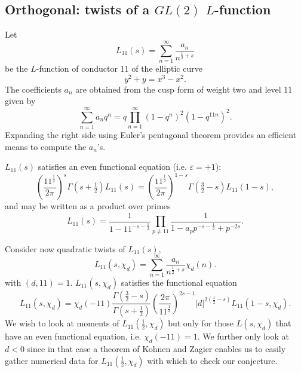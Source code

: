 \documentclass[12pt,letterpaper]{amsart}
\theoremstyle{plain}
\theoremstyle{definition}
\theoremstyle{remark}
\numberwithin{equation}{subsection}
\numberwithin{theorem}{subsection}
\numberwithin{table}{subsection}
\begin{document}

\subsection{  Orthogonal: twists of a $GL(2)$ $L$-function
}\label{sec:orthogonalnumerics}



Let
\begin{equation}
    L_{11}(s)=\sum_{n=1}^\infty \frac{a_n}{n^{\frac12 +s}}
\end{equation}
be the $L$-function of conductor 11 of the elliptic curve
\begin{equation}
    y^2+y=x^3-x^2.
\end{equation}
The coefficients $a_n$ are obtained from the cusp form of weight
two and level 11 given by
\begin{equation}
    \sum_{n=1}^\infty a_n q^n = q \prod_{n=1}^\infty (1-q^n)^2
(1-q^{11n})^2.
\end{equation}
Expanding the right side using Euler's pentagonal theorem provides
an efficient means to compute the $a_n$'s.

$L_{11}(s)$ satisfies an even functional equation (i.e.
$\varepsilon=+1$):
\begin{equation}
   \left(\frac{11^{\frac12 }}{2\pi}\right)^s\Gamma(s+\tfrac12 )L_{11}(s) =
   \left(\frac{11^{\frac12 }}{2\pi}\right)^{1-s}\Gamma(\tfrac32-s)L_{11}(1-s),
\end{equation}
and may be written as a product over primes
\begin{equation}
    L_{11}(s)=
    \frac{1}{1-11^{-s-\frac12 }}
    \prod_{p \neq 11}
    \frac{1}{1-a_pp^{-s-\frac12 }+p^{-2s}}.
\end{equation}

Consider now quadratic twists of $L_{11}(s)$,
\begin{equation}
    L_{11}(s,\chi_d)=\sum_{n=1}^\infty \frac{a_n}{n^{\frac12 +s}}
\chi_d(n).
\end{equation}
with $(d,11)=1$.
$L_{11}(s,\chi_d)$ satisfies the functional equation
\begin{equation}
    L_{11}(s,\chi_d) = \chi_d(-11)
                       \frac{\Gamma(\frac32-s)}{\Gamma(s+\frac12 )}
                       \left(\frac{2\pi}{11^{\frac12 }}\right)^{2s-1}
                       |d|^{2(\frac12 -s)}
                       L_{11}(1-s,\chi_d).
\end{equation}
We wish to look at moments of $L_{11}(\frac12 ,\chi_d)$ but only for those
$L(s,\chi_d)$ that have an even functional equation, i.e. $\chi_d(-11)=1$.
We further only look at
$d<0$ since in that case a theorem of Kohnen and Zagier \cite{KZ} enables us
to easily gather numerical data for 
$L_{11}(\frac12 ,\chi_d)$ with which to check our
conjecture.
\end{document}
